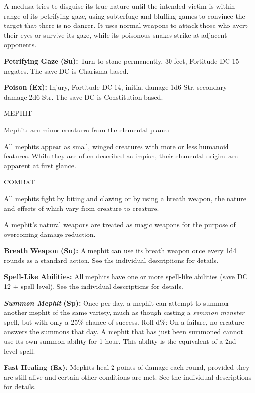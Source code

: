 \documentclass{article}
\begin{document}
A medusa tries to disguise its true nature until the intended victim is within 
range of its petrifying gaze, using subterfuge and bluffing games to convince the 
target that there is no danger. It uses normal weapons to attack those who avert 
their eyes or survive its gaze, while its poisonous snakes strike at adjacent opponents.

\textbf{Petrifying Gaze (Su):} Turn to stone permanently, 30 feet, Fortitude DC 
15 negates. The save DC is Charisma-based.

\textbf{Poison (Ex):} Injury, Fortitude DC 14, initial damage 1d6 Str, secondary 
damage 2d6 Str. The save DC is Constitution-based.

\vspace{12pt}
{\LARGE{}MEPHIT}

Mephits are minor creatures from the elemental planes. 

All mephits appear as small, winged creatures with more or less humanoid features. 
While they are often described as impish, their elemental origins are apparent 
at first glance.

COMBAT

All mephits fight by biting and clawing or by using a breath weapon, the nature 
and effects of which vary from creature to creature.

A mephit's natural weapons are treated as magic weapons for the purpose of overcoming 
damage reduction.

\textbf{Breath Weapon (Su):} A mephit can use its breath weapon once every 1d4 
rounds as a standard action. See the individual descriptions for details.

\textbf{Spell-Like Abilities:} All mephits have one or more spell-like abilities 
(save DC 12 + spell level). See the individual descriptions for details.

\textit{\textbf{Summon Mephit }}\textbf{(Sp):} Once per day, a mephit can attempt 
to summon another mephit of the same variety, much as though casting a \textit{summon 
monster }spell, but with only a 25\% chance of success. Roll d\%: On a failure, 
no creature answers the summons that day. A mephit that has just been summoned 
cannot use its own summon ability for 1 hour. This ability is the equivalent of 
a 2nd-level spell.

\textbf{Fast Healing (Ex):} Mephits heal 2 points of damage each round, provided 
they are still alive and certain other conditions are met. See the individual descriptions 
for details.
\end{document}
